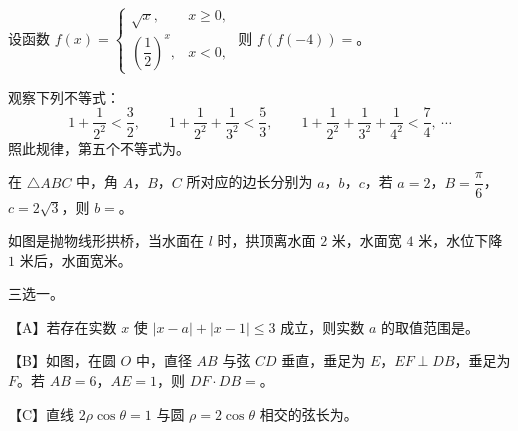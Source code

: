 \begin{question}
设函数 $f(x)=\begin{cases}\sqrt x,&x\geqslant0,\\ \left(\dfrac12\right)^x,&x<0,\end{cases}$ 则 $f(f(-4))=$\gkblank{}。

\end{question}
\begin{question}
观察下列不等式：
\nopagebreak[4]
\[1+\frac1{2^2}<\frac32,\qquad1+\frac1{2^2}+\frac1{3^2}<\frac53,\qquad1+\frac1{2^2}+\frac1{3^2}+\frac1{4^2}<\frac74,\ \cdots\]
照此规律，第五个不等式为\gkblank{}。

\end{question}
\begin{question}
在 $\triangle ABC$ 中，角 $A$，$B$，$C$ 所对应的边长分别为 $a$，$b$，$c$，若 $a=2$，$B=\dfrac\pi6$，$c=2\sqrt3$，则 $b=$\gkblank{}。

\Needspace{0.4\textheight}
\end{question}
\begin{question}
如图是抛物线形拱桥，当水面在 $l$ 时，拱顶离水面 $2$ 米，水面宽 $4$ 米，水位下降 $1$ 米后，水面宽\gkblank{}米。
\nopagebreak[4]
\begin{center}\end{center}
\nopagebreak[4]
\Needspace{0.4\textheight}
\end{question}
\begin{question}
三选一。

【A】若存在实数 $x$ 使 $|x-a|+|x-1|\leqslant3$ 成立，则实数 $a$ 的取值范围是\gkblank{}。

【B】如图，在圆 $O$ 中，直径 $AB$ 与弦 $CD$ 垂直，垂足为 $E$，$EF\perp DB$，垂足为 $F$。若 $AB=6$，$AE=1$，则 $DF\cdot DB=$\gkblank{}。
\nopagebreak[4]
\begin{center}\end{center}
\nopagebreak[4]
【C】直线 $2\rho\cos\theta=1$ 与圆 $\rho=2\cos\theta$ 相交的弦长为\gkblank{}。

\end{question}

